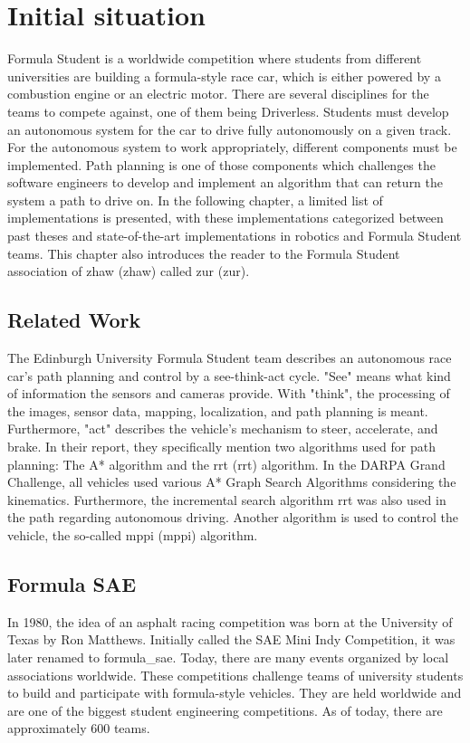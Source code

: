 \section{Initial situation} \label{sec:Initial situation}
Formula Student is a worldwide competition where students from different universities are building a formula-style race car, which is either powered by a combustion engine or an electric motor. There are several disciplines for the teams to compete against, one of them being Driverless. Students must develop an autonomous system for the car to drive fully autonomously on a given track. For the autonomous system to work appropriately, different components must be implemented. Path planning is one of those components which challenges the software engineers to develop and implement an algorithm that can return the system a path to drive on. In the following chapter, a limited list of implementations is presented, with these implementations categorized between past theses and state-of-the-art implementations in robotics and Formula Student teams. This chapter also introduces the reader to the Formula Student association of \acrlong{zhaw} (\acrshort{zhaw}) called \acrlong{zur} (\acrshort{zur}).

\subsection{Related Work} \label{sec:Related Work}
The Edinburgh University Formula Student team describes an autonomous race car's path planning and control by a see-think-act cycle. "See" means what kind of information the sensors and cameras provide. With "think", the processing of the images, sensor data, mapping, localization, and path planning is meant. Furthermore, "act" describes the vehicle's mechanism to steer, accelerate, and brake.
In their report, they specifically mention two algorithms used for path planning: The A* algorithm and the \acrlong{rrt} (\acrshort{rrt}) algorithm. In the DARPA Grand Challenge, all vehicles used various A* Graph Search Algorithms considering the kinematics. Furthermore, the incremental search algorithm \acrshort{rrt} was also used in the path regarding autonomous driving.
Another algorithm is used to control the vehicle, the so-called \acrlong{mppi} (\acrshort{mppi}) algorithm.
\cite{path_planning_and_control_georgiev} \cite{darpa_grand_challenge} 

\subsection{Formula SAE}
In 1980, the idea of an asphalt racing competition was born at the University of Texas by Ron Matthews. Initially called the SAE Mini Indy Competition, it was later renamed to \Gls{formula_sae}. Today, there are many events organized by local associations worldwide.
\cite{formula_sae}
These competitions challenge teams of university students to build and participate with formula-style vehicles. They are held worldwide and are one of the biggest student engineering competitions. As of today, there are approximately 600 teams. \cite{sae_student_events}

